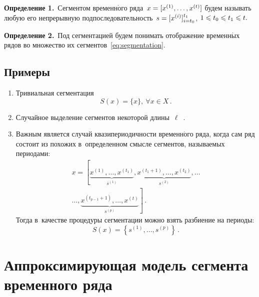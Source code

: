 \begin{multicols}{2}
\noindent
\textbf{Определение 1.}\
Сегментом временн$\acute{\mbox{о}}$го ряда~$x\hm=[x^{(1)},\dots,x^{(t)}]$ будем 
называть любую его непрерывную подпоследовательность~$s\hm=[x^{(i)}]_{i=t_0}^{t_1}$, 
$1\hm\leqslant t_0\hm\leqslant t_1\hm\leqslant t.$

\smallskip

\noindent
\textbf{Определение 2.}\
Под сегментацией будем понимать отображение временн$\acute{\mbox{ы}}$х рядов 
во множество их сегментов~\eqref{eq:segmentation}.


\smallskip

\subsection*{Примеры}

\begin{enumerate}[1.]
\item
  Тривиальная сегментация
  \begin{equation}
  \label{eq:equal_fragmenting}
  S(x)=\{x\},\ \forall x\in X\,.
  \end{equation}

\item
  Случайное выделение сегментов некоторой длины~$\ell$~\cite{geurts2005segment}.

\item
  Важным является случай квазипериодичности временн$\acute{\mbox{о}}$го 
  ряда, когда сам ряд состоит из похожих в~определенном смысле сегментов, 
  называемых периодами:
  \begin{multline*}
  x=\left[\underbrace{x^{(1)},\dots,x^{(t_1)}}_{s^{(1)}},\underbrace{x^{(t_1+1)},
\dots,x^{(t_2)}}_{s^{(2)}},\dots\right.\\
\left.\dots,\underbrace{x^{(t_{p-1}+1)},\dots,x^{(t)}}_{s^{(p)}}
  \right]\,.
  \end{multline*}
  Тогда в~качестве процедуры сегментации можно взять разбиение на периоды:
  \begin{equation*}
  S(x)= \left\{s^{(1)},\dots,s^{(p)}\right\}\,.
  \end{equation*}
\end{enumerate}


\section{Аппроксимирующая модель сегмента временного ряда}


\end{multicols}
